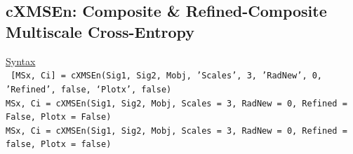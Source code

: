\documentclass[12pt, a4paper, titlepage, openany]{book}
\begin{document}
\newpage
\subsection{\normalsize cXMSEn: \hspace{15mm} Composite \& Refined-Composite Multiscale Cross-Entropy} \label{cXMSEn}
\noindent\ul{Syntax} \vspace{6mm} \\ \noindent \texttt{\footnotesize
[MSx, Ci] = cXMSEn(Sig1, Sig2, Mobj, 'Scales', 3, 'RadNew', 0, 'Refined', false, ‘Plotx’, false)\\
MSx, Ci = cXMSEn(Sig1, Sig2, Mobj, Scales = 3, RadNew = 0, Refined = False, Plotx = False)\\ 
MSx, Ci = cXMSEn(Sig1, Sig2, Mobj, Scales = 3, RadNew = 0, Refined = false, Plotx = false)}
\end{document}
